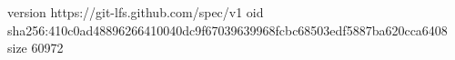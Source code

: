 version https://git-lfs.github.com/spec/v1
oid sha256:410c0ad48896266410040dc9f67039639968fcbc68503edf5887ba620cca6408
size 60972

